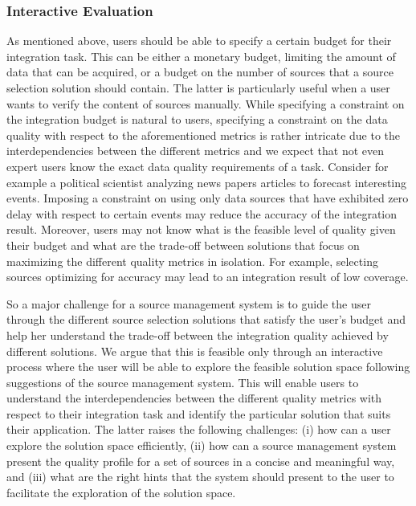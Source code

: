 \documentclass{sig-alternate}
\begin{document}
\subsubsection{Interactive Evaluation}
\label{sec:eval}
As mentioned above, users should be able to specify a certain budget for their integration task. This can be either a monetary budget, limiting the amount of data that can be acquired, or a budget on the number of sources that a source selection solution should contain. The latter is particularly useful when a user wants to verify the content of sources manually. While specifying a constraint on the integration budget is natural to users, specifying a constraint on the data quality with respect to the aforementioned metrics is rather intricate due to the interdependencies between the different metrics and we expect that not even expert users know the exact data quality requirements of a task. Consider for example a political scientist analyzing news papers articles to forecast interesting events. Imposing a constraint on using only data sources that have exhibited zero delay with respect to certain events may reduce the accuracy of the integration result. Moreover, users may not know what is the feasible level of quality given their budget and what are the trade-off between solutions that focus on maximizing the different quality metrics in isolation. For example, selecting sources optimizing for accuracy may lead to an integration result of low coverage.  

So a major challenge for a source management system is to guide the user through the different source selection solutions that satisfy the user's budget and help her understand the trade-off between the integration quality achieved by different solutions. We argue that this is feasible only through an interactive process where the user will be able to explore the feasible solution space following suggestions of the source management system. This will enable users to understand the interdependencies between the different quality metrics with respect to their integration task and identify the particular solution that suits their application. The latter raises the following challenges: (i) how can a user explore the solution space efficiently, (ii) how can a source management system present the quality profile for a set of sources in a concise and meaningful way, and (iii) what are the right hints that the system should present to the user to facilitate the exploration of the solution space. 
\end{document}

